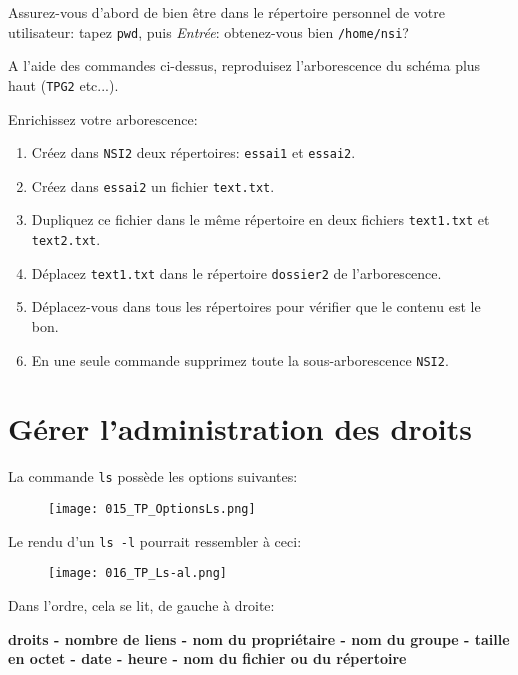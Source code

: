 \documentclass[12pt]{article}
\begin{document}
	\begin{MonExo}
		\begin{alphenum}
			\item Assurez-vous d'abord de bien être dans le répertoire personnel de votre utilisateur: tapez \texttt{pwd}, puis \textit{Entrée}: obtenez-vous bien \texttt{/home/nsi}?
			\item A l'aide des commandes ci-dessus, reproduisez l'arborescence du schéma plus haut (\texttt{TPG2} etc...).
			\item Enrichissez votre arborescence:
			\begin{enumerate}
				\item Créez dans \texttt{NSI2} deux répertoires: \texttt{essai1} et \texttt{essai2}.
				\item Créez dans \texttt{essai2} un fichier \texttt{text.txt}.
				\item Dupliquez ce fichier dans le même répertoire en deux fichiers \texttt{text1.txt} et \texttt{text2.txt}.
				\item Déplacez \texttt{text1.txt} dans le répertoire \texttt{dossier2} de l'arborescence.
				\item Déplacez-vous dans tous les répertoires pour vérifier que le contenu est le bon.
				\item En une seule commande supprimez toute la sous-arborescence \texttt{NSI2}.
			\end{enumerate}
		\end{alphenum}
	\end{MonExo}
	
	\section{Gérer l'administration des droits}
	
	La commande \texttt{ls} possède les options suivantes:
	\begin{figure}[H]
		\centering
		\texttt{[image: 015\_TP\_OptionsLs.png]}
	\end{figure}
	
	Le rendu d'un \texttt{ls -l} pourrait ressembler à ceci:
	 \begin{figure}[H]
	 	\centering
	 	\texttt{[image: 016\_TP\_Ls-al.png]}
	 \end{figure}
	 
	 Dans l'ordre, cela se lit, de gauche à droite:
	 
	 \textbf{droits - nombre de liens - nom du propriétaire - nom du groupe - taille en octet - date - heure - nom du fichier ou du répertoire}
\end{document}
